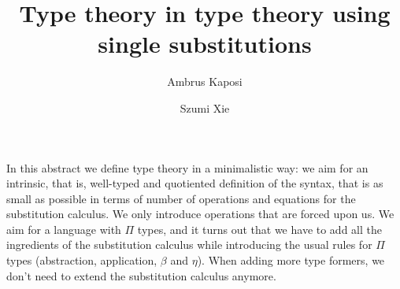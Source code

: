 \documentclass{easychair}
\title{Type theory in type theory using single substitutions}
\author{
Ambrus Kaposi
\and
Szumi Xie
}
\institute{
   Eötvös Loránd University,
   Budapest, Hungary, 
   \email{\{akaposi|szumi\}@inf.elte.hu}
}
\begin{document}
\maketitle

\newcommand{\Ra}{\Rightarrow}
\newcommand{\ra}{\rightarrow}
\newcommand{\Con}{\mathsf{Con}}
\newcommand{\Var}{\mathsf{Var}}
\newcommand{\var}{\mathsf{var}}
\newcommand{\Tm}{\mathsf{Tm}}
\newcommand{\Ty}{\mathsf{Ty}}
\newcommand{\Sub}{\mathsf{Sub}}
\newcommand{\U}{\mathsf{U}}
\newcommand{\El}{\mathsf{El}}
\renewcommand{\c}{\mathsf{c}}
\newcommand{\lam}{\mathsf{lam}}
\newcommand{\app}{\mathsf{app}}
\newcommand{\oldapp}{\mathbin{\cdot}}
\renewcommand{\tt}{\mathsf{tt}}
\newcommand{\Br}{\mathsf{Br}}
\newcommand{\aps}{\mathsf{aps}}
\newcommand{\ap}{\mathsf{ap}}
\newcommand{\mkBrPi}{\mathsf{mkBr}{\Pi}}
\newcommand{\Gel}{\mathsf{Gel}}
\newcommand{\gel}{\mathsf{gel}}
\newcommand{\ungel}{\mathsf{ungel}}
\renewcommand{\sp}{\hspace{1.5em}}
\newcommand{\blank}{\mathord{\hspace{1pt}\text{--}\hspace{1pt}}} %
\newcommand{\Set}{\mathsf{Set}}
\newcommand{\ext}{\mathop{\triangleright}}
\newcommand{\R}{\mathsf{R}}
\newcommand{\p}{\mathsf{p}}
\renewcommand{\S}{\mathsf{S}}
\newcommand{\vz}{\mathsf{vz}}
\newcommand{\vs}{\mathsf{vs}}

In this abstract we define type theory in a minimalistic way: we aim
for an intrinsic, that is, well-typed and quotiented definition of the
syntax, that is as small as possible in terms of number of operations
and equations for the substitution calculus. We only introduce
operations that are forced upon us. We aim for a language with $\Pi$
types, and it turns out that we have to add all the ingredients of the
substitution calculus while introducing the usual rules for $\Pi$
types (abstraction, application, $\beta$ and $\eta$). When adding more
type formers, we don't need to extend the substitution calculus
anymore.
\end{document}
